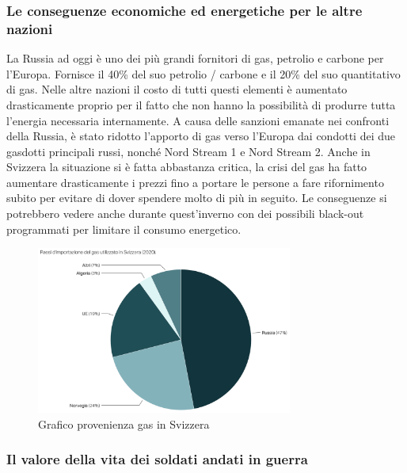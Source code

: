 \documentclass[a4paper, 12pt]{article}
\begin{document}
\subsubsection{Le conseguenze economiche ed energetiche per le altre nazioni}

La Russia ad oggi è uno dei più grandi fornitori di gas, petrolio e carbone per l'Europa. Fornisce il 40\% del suo petrolio / carbone e il 20\% del suo quantitativo di gas. Nelle altre nazioni il costo di tutti questi elementi è aumentato drasticamente proprio per il fatto che non hanno la possibilità di produrre tutta l'energia necessaria internamente. A causa delle sanzioni emanate nei confronti della Russia, è stato ridotto l'apporto di gas verso l'Europa dai condotti dei due gasdotti principali russi, nonché Nord Stream 1 e Nord Stream 2. Anche in Svizzera la situazione si è fatta abbastanza critica, la crisi del gas ha fatto aumentare drasticamente i prezzi fino a portare le persone a fare rifornimento subito per evitare di dover spendere molto di più in seguito. Le conseguenze si potrebbero vedere anche durante quest'inverno con dei possibili black-out programmati per limitare il consumo energetico.

\begin{figure}[h]
    \centering
    \includegraphics[width=0.75\textwidth]{images/grafico_provenienza_gas_svizzera.png}
    \caption{Grafico provenienza gas in Svizzera}
\end{figure}



\pagebreak

\subsubsection{Il valore della vita dei soldati andati in guerra}
\end{document}
